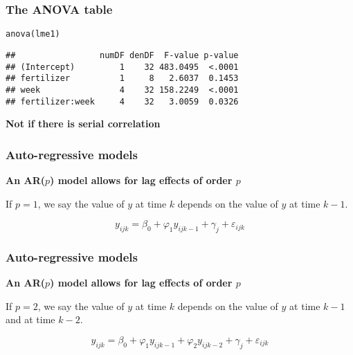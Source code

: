 \documentclass[color=usenames,dvipsnames]{beamer}\usepackage[]{graphicx}\usepackage[]{color}
\makeatletter
\newcommand{\hlstd}[1]{\textcolor[rgb]{0,0,0}{#1}}%
\newcommand{\hlkwd}[1]{\textcolor[rgb]{0.004,0.004,0.506}{#1}}%
\newenvironment{kframe}{%
 \def\at@end@of@kframe{}%
 \ifinner\ifhmode%
  \def\at@end@of@kframe{\end{minipage}}%
  \begin{minipage}{\columnwidth}%
 \fi\fi%
 \def\FrameCommand##1{\hskip\@totalleftmargin \hskip-\fboxsep
 \colorbox{shadecolor}{##1}\hskip-\fboxsep
     \hskip-\linewidth \hskip-\@totalleftmargin \hskip\columnwidth}%
 \MakeFramed {\advance\hsize-\width
   \@totalleftmargin\z@ \linewidth\hsize
   \@setminipage}}%
 {\par\unskip\endMakeFramed%
 \at@end@of@kframe}
\newenvironment{knitrout}{}{} %
\makeatother
\begin{document}
\begin{frame}[fragile]
  \frametitle{The ANOVA table}
\begin{knitrout}
\color{fgcolor}\begin{kframe}
\begin{alltt}
\hlkwd{anova}\hlstd{(lme1)}
\end{alltt}
\begin{verbatim}
##                 numDF denDF  F-value p-value
## (Intercept)         1    32 483.0495  <.0001
## fertilizer          1     8   2.6037  0.1453
## week                4    32 158.2249  <.0001
## fertilizer:week     4    32   3.0059  0.0326
\end{verbatim}
\end{kframe}
\end{knitrout}
\pause
\vfill
\Large
{\centering \bf \color{PineGreen}{Are these $P$-values valid?} \par}
\pause
\vfill
{\centering \bf Not if there is serial correlation \par}
\end{frame}





\begin{frame}
  \frametitle{Auto-regressive models}
  \bf
  An AR($p$) model allows for lag effects of order $p$ \par
  \vfill
  If $p=1$, we say the value of $y$ at time $k$ depends on the value
  of $y$ at time $k-1$. \par
  \pause
  \vfill
  \Large
  \[
    y_{ijk} = \beta_0 + \varphi_1 y_{ijk-1} + \gamma_j + \varepsilon_{ijk}
  \]
\end{frame}




\begin{frame}
  \frametitle{Auto-regressive models}
  \bf
  An AR($p$) model allows for lag effects of order $p$ \par
  \vfill
  If $p=2$, we say the value of $y$ at time $k$ depends on the value
  of $y$ at time $k-1$ and at time $k-2$. \par
  \vfill
  \pause
  \Large
  \[
    y_{ijk} = \beta_0 + \varphi_1 y_{ijk-1} + \varphi_2 y_{ijk-2} + \gamma_j + \varepsilon_{ijk}
  \]
\end{frame}
\end{document}
